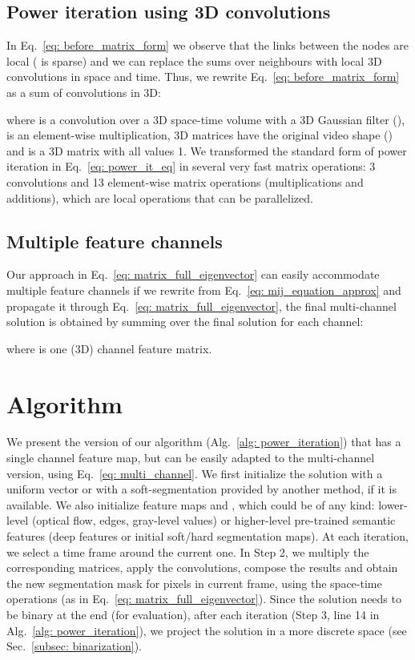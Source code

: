 \documentclass{article}
\begin{document}
\subsection{Power iteration using 3D convolutions}
In Eq.~\ref{eq: before_matrix_form} we observe that the links between the nodes are local ( is sparse) and we can replace the sums over neighbours with local 3D convolutions in space and time. Thus, we rewrite Eq.~\ref{eq: before_matrix_form} as a sum of convolutions in 3D:




where  is a convolution over a 3D space-time volume with a 3D Gaussian filter (),  is an element-wise multiplication, 3D matrices  have the original video shape () and  is a 3D matrix with all values 1. We transformed the 
standard form of power iteration in Eq.~\ref{eq: power_it_eq} in several very fast matrix operations: 3 convolutions and 13 element-wise matrix operations (multiplications and additions), which are local operations that can be parallelized. 
\subsection{Multiple feature channels}
Our approach in Eq.~\ref{eq: matrix_full_eigenvector} can easily accommodate multiple feature channels if we rewrite  from Eq.~\ref{eq: mij_equation_approx} and propagate it through Eq.~\ref{eq: matrix_full_eigenvector}, the final multi-channel solution is obtained by summing over the final solution for each channel:





where  is one (3D) channel feature matrix.

\section{Algorithm}
\label{sec: algorithm}
We present the version of our algorithm (Alg.~\ref{alg: power_iteration}) that has a single channel feature map, but can be easily adapted to the multi-channel version, using Eq.~\ref{eq: multi_channel}. We first initialize the solution  with a uniform vector or with a soft-segmentation provided by another method, if it is available. We also initialize feature maps
 and , which could be of any kind: lower-level (optical flow, edges, gray-level values) or higher-level pre-trained semantic features (deep features or initial soft/hard segmentation maps). 
At each iteration, we select a time frame around the current one. In Step 2, we multiply the corresponding matrices, apply the convolutions, compose the results and obtain the new segmentation mask for pixels in current frame, using the space-time operations (as in Eq.~\ref{eq: matrix_full_eigenvector}). Since the solution needs to be binary at the end (for evaluation), after each iteration (Step 3, line 14 in Alg.~\ref{alg: power_iteration}), we project the solution in a more discrete space (see Sec.~\ref{subsec: binarization}). 
\end{document}
